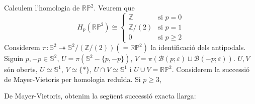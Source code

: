 \documentclass[compress,10pt]{article}
\theoremstyle{definition}
\begin{document}
Calculem l'homologia de $\mathbb{RP}^{2}$. Veurem que
\begin{equation*}
    H_{p}(\mathbb{RP}^{2})\cong\begin{cases}
        \mathbb{Z}&\textrm{si $p=0$}\\
        \mathbb{Z}/(2)&\textrm{si $p=1$}\\
        0&\textrm{si $p\geq2$}
    \end{cases}
\end{equation*}
Considerem $\pi:\mathbb{S}^{2}\twoheadrightarrow\mathbb{S}^{2}/(\mathbb{Z}/(2))(=\mathbb{RP}^{2})$ la identificació dels antipodals. Siguin $p,-p\in\mathbb{S}^{2}$, $U=\pi(\mathbb{S}^{2}-\{p,-p\})$, $V=\pi(\mathscr{B}(p;\varepsilon)\sqcup\mathscr{B}(-p;\varepsilon))$. $U,V$ són oberts, $U\simeq\mathbb{S}^{1}$, $V\simeq\{*\}$, $U\cap V\simeq\mathbb{S}^{1}$ i $U\cup V=\mathbb{RP}^{2}$. Considerem la successió de Mayer-Vietoris per homologia reduïda. Si $p\geq3$,
\begin{center}
\end{center}
De Mayer-Vietoris, obtenim la següent successió exacta llarga:
\begin{center}
\end{center}
\end{document}
